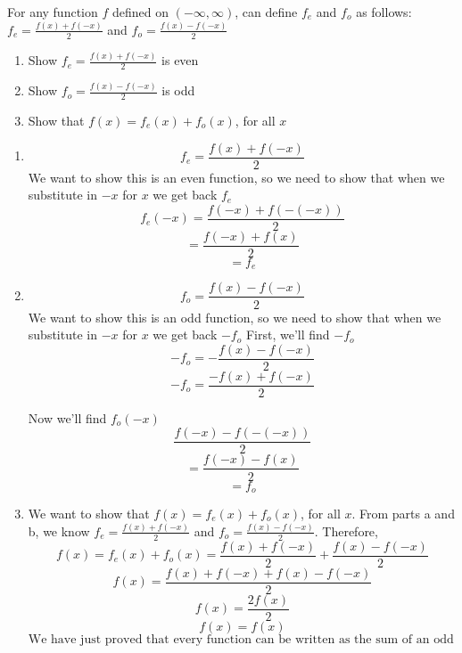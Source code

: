 \documentclass[noinstructornotes]{ximera}
\begin{document}
\begin{problem}
For any function $f$ defined on $(-\infty,\infty)$, can define $f_e$ and $f_o$ as follows: $f_e=\frac{f(x)+f(-x)}{2}$ and $f_o=\frac{f(x)-f(-x)}{2}$


\begin{enumerate}	
	\item  Show  $f_e=\frac{f(x)+f(-x)}{2}$  is even
	
	\item  Show $f_o=\frac{f(x)-f(-x)}{2}$ is odd

	\item Show that $f(x)=f_e(x)+f_o(x)$, for all $x$

	
	\end{enumerate}
	
	\begin{freeResponse}
		\begin{enumerate}
		
		\item $$f_e=\frac{f(x)+f(-x)}{2}$$
			We want to show this is an even function, so we need to show that when we substitute in $-x$ for $x$ we get back $f_e$
			$$f_e(-x)=\frac{f(-x)+f(-(-x))}{2}$$ 
			$$=\frac{f(-x)+f(x)}{2}$$
			$$=f_e$$

		
		\item   $$f_o=\frac{f(x)-f(-x)}{2}$$
			We want to show this is an odd function, so we need to show that when we substitute in $-x$ for $x$ we get back $-f_o$
			First, we'll find $-f_o$
			$$-f_o=-\frac{f(x)-f(-x)}{2}$$
			$$-f_o=\frac{-f(x)+f(-x)}{2}$$

			Now we'll find $f_o(-x)$
			$$\frac{f(-x)-f(-(-x))}{2}$$ 
			$$=\frac{f(-x)-f(x)}{2}$$
			$$=f_o$$
		
		\item We want to show that $f(x)=f_e(x)+f_o(x)$, for all $x$.  From parts a and b, we know $f_e=\frac{f(x)+f(-x)}{2}$ and $f_o=\frac{f(x)-f(-x)}{2}$.  Therefore,
			$$f(x)=f_e(x)+f_o(x)=\frac{f(x)+f(-x)}{2}+\frac{f(x)-f(-x)}{2}$$
			$$f(x)=\frac{f(x)+f(-x)+f(x)-f(-x)}{2}$$
			$$f(x)=\frac{2f(x)}{2}$$
			$$f(x)=f(x)$$
			$$\text{We have just proved that every function can be written as the sum of an odd function and an even function.}$$

		\end{enumerate}
	\end{freeResponse}
	
\end{problem}

\begin{instructorNotes}

\end{instructorNotes}
\end{document}
